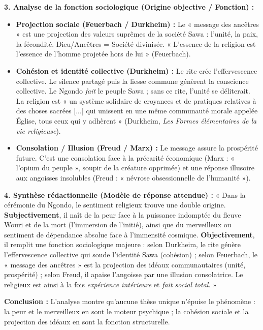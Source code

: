 \documentclass[11pt]{article}
\newcommand{\cle}[1]{{\popxbold\color{popdark}#1}}
\begin{document}
\begin{exoresolu}
\textbf{3. Analyse de la fonction sociologique (Origine objective / Fonction) :}
\begin{itemize}
    \item \textbf{Projection sociale (Feuerbach / Durkheim) :} Le « message des ancêtres » est une \cle{projection} des valeurs suprêmes de la société Sawa : l'unité, la paix, la fécondité. Dieu/Ancêtres = Société divinisée. « L'essence de la religion est l'essence de l'homme projetée hors de lui » (Feuerbach).
    \item \textbf{Cohésion et identité collective (Durkheim) :} Le rite crée l'\cle{effervescence collective}. Le silence partagé puis la liesse commune génèrent la \cle{conscience collective}. Le Ngondo \emph{fait} le peuple Sawa ; sans ce rite, l'unité se déliterait. La religion est « un système solidaire de croyances et de pratiques relatives à des choses sacrées [...] qui unissent en une même communauté morale appelée Église, tous ceux qui y adhèrent » (Durkheim, \emph{Les Formes élémentaires de la vie religieuse}).
    \item \textbf{Consolation / Illusion (Freud / Marx) :} Le message assure la prospérité future. C'est une \cle{consolation} face à la précarité économique (Marx : « l'opium du peuple », soupir de la créature opprimée) et une \cle{réponse illusoire} aux angoisses insolubles (Freud : « névrose obsessionnelle de l'humanité »).
\end{itemize}

\textbf{4. Synthèse rédactionnelle (Modèle de réponse attendue) :}
« Dans la cérémonie du Ngondo, le sentiment religieux trouve une double origine. \textbf{Subjectivement}, il naît de la \cle{peur} face à la puissance indomptée du fleuve Wouri et de la mort (l'immersion de l'initié), ainsi que du \cle{merveilleux} ou sentiment de dépendance absolue face à l'immensité cosmique. \textbf{Objectivement}, il remplit une fonction \cle{sociologique} majeure : selon Durkheim, le rite génère l'effervescence collective qui soude l'identité Sawa (cohésion) ; selon Feuerbach, le « message des ancêtres » est la projection des idéaux communautaires (unité, prospérité) ; selon Freud, il apaise l'angoisse par une illusion consolatrice. Le religieux est ainsi à la fois \emph{expérience intérieure} et \emph{fait social total}. »

\textbf{Conclusion :} L'analyse montre qu'aucune thèse unique n'épuise le phénomène : la peur et le merveilleux en sont le moteur psychique ; la cohésion sociale et la projection des idéaux en sont la fonction structurelle.
\end{exoresolu}
\end{document}
